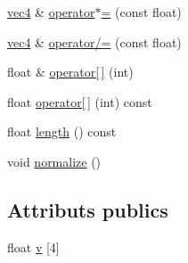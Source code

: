 \begin{DoxyCompactItemize}
\item 
\hyperlink{structvec4}{vec4} \& \hyperlink{structvec4_acae68701758bc16a76dfea01a5f0a6ca}{operator$\ast$=} (const float)
\item 
\hyperlink{structvec4}{vec4} \& \hyperlink{structvec4_a829f38d68e61a06912fa0ecceea2f5b8}{operator/=} (const float)
\item 
float \& \hyperlink{structvec4_a5ac0a516e60ad3981d2ec759175c041e}{operator\mbox{[}$\,$\mbox{]}} (int)
\item 
float \hyperlink{structvec4_a58383345bb89ec9ea9951c17f3f700f7}{operator\mbox{[}$\,$\mbox{]}} (int) const 
\item 
float \hyperlink{structvec4_aa1c5dd86c8fbde45d6b6beabe45487e2}{length} () const 
\item 
void \hyperlink{structvec4_a8c0f2d44186f0eb32b6ced56af8ac9e8}{normalize} ()
\end{DoxyCompactItemize}
\subsection*{Attributs publics}
\begin{DoxyCompactItemize}
\item 
float \hyperlink{structvec4_a08f56ae363c0cabebd3fe446ef28e652}{v} \mbox{[}4\mbox{]}
\end{DoxyCompactItemize}


